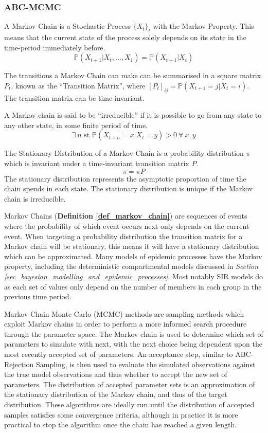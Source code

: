 \documentclass[11pt,a4paper]{article}
\newcommand*{\prob}{\mathbb{P}}
\theoremstyle{break}
\begin{document}
\subsubsection{ABC-MCMC}\label{sec_abc_mcmc}

  \begin{box_definition}\label{def_markov_chain}
    A Markov Chain is a Stochastic Process $\{X_t\}_{t}$ with the Markov Property. This means that the current state of the process solely depends on its state in the time-period immediately before.
    \[ \prob(X_{t+1}|X_t,\dots,X_1)=\prob(X_{t+1}|X_t) \]
    \par The transitions a Markov Chain can make can be summarised in a square matrix $P_t$, known as the ``Transition Matrix'', where $[P_t]_{ij}=\prob(X_{t+1}=j|X_t=i)$. The transition matrix can be time invariant.
    \par A Markov chain is said to be ``irreducible'' if it is possible to go from any state to any other state, in some finite period of time.
    \[ \exists\ n\text{ st }\prob(X_{t+n}=x|X_t=y)>0\ \forall\ x,y \]
    \par The Stationary Distribution of a Markov Chain is a probability distribution $\pi$ which is invariant under a time-invariant transition matrix $P$.
    \[ \pi=\pi P \]
    The stationary distribution represents the asymptotic proportion of time the chain spends in each state. The stationary distribution is unique if the Markov chain is irreducible.
  \end{box_definition}

  \par Markov Chains (\textbf{Definition \ref{def_markov_chain}}) are sequences of events where the probability of which event occurs next only depends on the current event. When targeting a probability distribution the transition matrix for a Markov chain will be stationary, this means it will have a stationary distribution which can be approximated. Many models of epidemic processes have the Markov property, including the deterministic compartmental models discussed in \textit{Section \ref{sec_bayesian_modelling_and_epidemic_processes}}. Most notably SIR models do as each set of values only depend on the number of members in each group in the previous time period.

  \par Markov Chain Monte Carlo (MCMC) methods are sampling methods which exploit Markov chains in order to perform a more informed search procedure through the parameter space. The Markov chain is used to determine which set of parameters to simulate with next, with the next choice being dependent upon the most recently accepted set of parameters. An acceptance step, similar to ABC-Rejection Sampling, is then used to evaluate the simulated observations against the true model observations and thus whether to accept the new set of parameters. The distribution of accepted parameter sets is an approximation of the stationary distribution of the Markov chain, and thus of the target distribution. These algorithms are ideally run until the distribution of accepted samples satisfies some convergence criteria, although in practice it is more practical to stop the algorithm once the chain has reached a given length.
\end{document}
